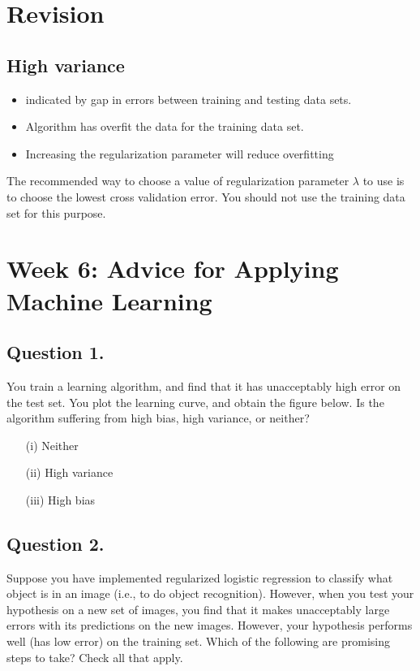\documentclass[11pt]{article} %
\begin{document}

\section*{Revision}
\subsection*{High variance}

\begin{itemize}
	\item indicated by gap in errors between training and testing data sets.
	\item Algorithm has overfit the data for the training data set.
	\item Increasing the regularization parameter will reduce overfitting
\end{itemize}
The recommended way to choose a value of regularization parameter $\lambda$ to use is to choose
the lowest cross validation error.
You should not use the training data set for this purpose.

\newpage
\section*{Week 6: Advice for Applying Machine Learning}

\subsection*{Question 1. }
You train a learning algorithm, and find that it has unacceptably high error on the test set. You plot the learning curve, and obtain the figure below. Is the algorithm suffering from high bias, high variance, or neither?

\begin{itemize}
	\item[(i)] Neither
	
	\item[(ii)] High variance
	
	\item[(iii)] High bias
\end{itemize}


\subsection*{Question 2. }
Suppose you have implemented regularized logistic regression  to classify what object is in an image (i.e., to do object recognition). However, when you test your hypothesis on a new set of images, you find that it makes unacceptably large errors with its predictions on the new images. However, your hypothesis performs well (has low error) on the training set. Which of the following are promising steps to take? Check all that apply.
\end{document}
